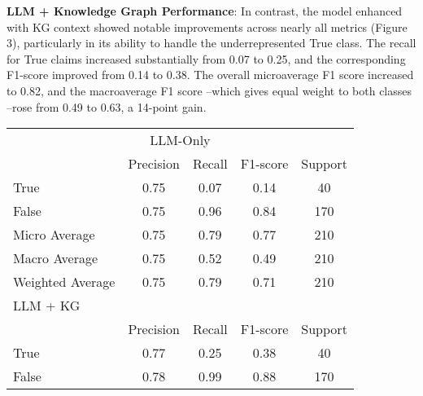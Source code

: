\documentclass[11pt]{article}
\begin{document}
\textbf{LLM + Knowledge Graph Performance}: In contrast, the model enhanced with KG context showed notable improvements across nearly all metrics (Figure 3), particularly in its ability to handle the underrepresented True class. The recall for True claims increased substantially from 0.07 to 0.25, and the corresponding F1-score improved from 0.14 to 0.38. The overall microaverage F1 score increased to 0.82, and the macroaverage F1 score –which gives equal weight to both classes –rose from 0.49 to 0.63, a 14-point gain.


\begin{table}[H]
\begin{center}
\begin{tabular}{lcccc}
\hline
\multicolumn{5}{c}{LLM-Only}                                                                                                               \\
                 & \multicolumn{1}{l}{Precision} & \multicolumn{1}{l}{Recall} & \multicolumn{1}{l}{F1-score} & \multicolumn{1}{l}{Support} \\ \hline
True             & 0.75                          & 0.07                       & 0.14                         & 40                          \\
False            & 0.75                          & 0.96                       & 0.84                         & 170                         \\
Micro Average    & 0.75                          & 0.79                       & 0.77                         & 210                         \\
Macro Average    & 0.75                          & 0.52                       & 0.49                         & 210                         \\
Weighted Average & 0.75                          & 0.79                       & 0.71                         & 210                         \\ \hline
\multicolumn{5}{l}{LLM + KG}                                                                                                               \\ \hline
                 & \multicolumn{1}{l}{Precision} & \multicolumn{1}{l}{Recall} & \multicolumn{1}{l}{F1-score} & \multicolumn{1}{l}{Support} \\
True             & 0.77                          & 0.25                       & 0.38                         & 40                          \\
False            & 0.78                          & 0.99                       & 0.88                         & 170                         \\

\end{tabular}
\end{center}
\end{table}
\end{document}
